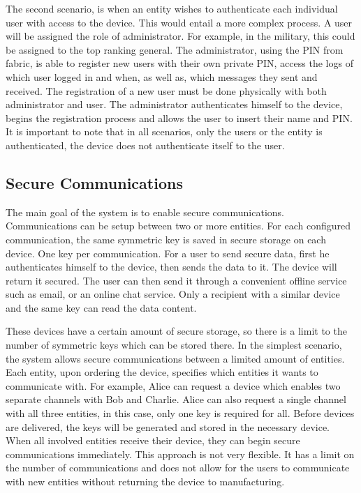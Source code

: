 The second scenario, is when an entity wishes to authenticate each individual user with access to the device. 
This would entail a more complex process. A user will be assigned the role of administrator. For example, in the military, this could be assigned to the top ranking general. The administrator, using the \ac{PIN} from fabric, is able to register new users with their own private \ac{PIN}, access the logs of which user logged in and when, as well as, which messages they sent and received.
The registration of a new user must be done physically with both administrator and user. The administrator authenticates himself to the device, begins the registration process and allows the user to insert their name and \ac{PIN}.
It is important to note that in all scenarios, only the users or the entity is authenticated, the device does not authenticate itself to the user.

\subsection{Secure Communications}\label{chap:problem:scenarios:comms}
The main goal of the system is to enable secure communications. Communications can be setup between two or more entities. For each configured communication, the same symmetric key is saved in secure storage on each device. One key per communication.
For a user to send secure data, first he authenticates himself to the device, then sends the data to it. The device will return it secured. The user can then send it through a convenient offline service such as email, or an online chat service. Only a recipient with a similar device and the same key can read the data content.

These devices have a certain amount of secure storage, so there is a limit to the number of symmetric keys which can be stored there.
In the simplest scenario, the system allows secure communications between a limited amount of entities. Each entity, upon ordering the device, specifies which entities it wants to communicate with. For example, Alice can request a device which enables two separate channels with Bob and Charlie. Alice can also request a single channel with all three entities, in this case, only one key is required for all.
Before devices are delivered, the keys will be generated and stored in the necessary device. When all involved entities receive their device, they can begin secure communications immediately.
This approach is not very flexible. It has a limit on the number of communications and does not allow for the users to communicate with new entities without returning the device to manufacturing.

